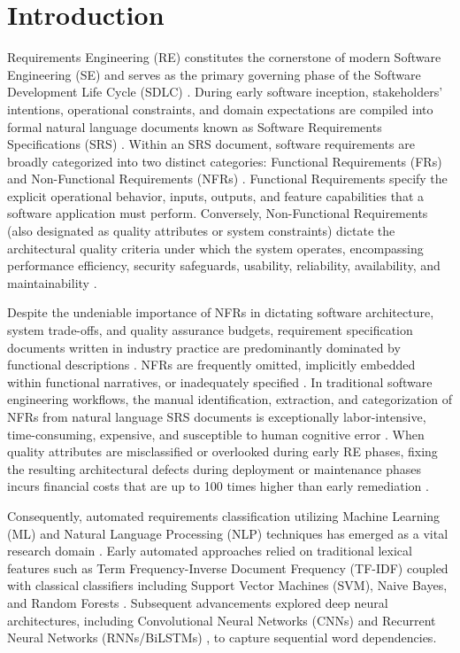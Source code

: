 \documentclass[11pt,a4paper]{article}
\begin{document}
\newpage

\section{Introduction}\label{sec:intro}
Requirements Engineering (RE) constitutes the cornerstone of modern Software Engineering (SE) and serves as the primary governing phase of the Software Development Life Cycle (SDLC) \cite{berry2017importance, fernandez2015naming}. During early software inception, stakeholders' intentions, operational constraints, and domain expectations are compiled into formal natural language documents known as Software Requirements Specifications (SRS) \cite{glinz2007non}. Within an SRS document, software requirements are broadly categorized into two distinct categories: Functional Requirements (FRs) and Non-Functional Requirements (NFRs) \cite{kurtanovic2017automatically, slankas2013automated}. Functional Requirements specify the explicit operational behavior, inputs, outputs, and feature capabilities that a software application must perform. Conversely, Non-Functional Requirements (also designated as quality attributes or system constraints) dictate the architectural quality criteria under which the system operates, encompassing performance efficiency, security safeguards, usability, reliability, availability, and maintainability \cite{abad2016do, cleland2007automated}.

Despite the undeniable importance of NFRs in dictating software architecture, system trade-offs, and quality assurance budgets, requirement specification documents written in industry practice are predominantly dominated by functional descriptions \cite{dalpiaz2020agile}. NFRs are frequently omitted, implicitly embedded within functional narratives, or inadequately specified \cite{lu2017automatic}. In traditional software engineering workflows, the manual identification, extraction, and categorization of NFRs from natural language SRS documents is exceptionally labor-intensive, time-consuming, expensive, and susceptible to human cognitive error \cite{sharma2020machine}. When quality attributes are misclassified or overlooked during early RE phases, fixing the resulting architectural defects during deployment or maintenance phases incurs financial costs that are up to 100 times higher than early remediation \cite{fernandez2015naming}.

Consequently, automated requirements classification utilizing Machine Learning (ML) and Natural Language Processing (NLP) techniques has emerged as a vital research domain \cite{kasper2022automated, winkler2018automatic}. Early automated approaches relied on traditional lexical features such as Term Frequency-Inverse Document Frequency (TF-IDF) coupled with classical classifiers including Support Vector Machines (SVM), Naive Bayes, and Random Forests \cite{kurtanovic2017automatically, slankas2013automated}. Subsequent advancements explored deep neural architectures, including Convolutional Neural Networks (CNNs) \cite{winkler2018automatic} and Recurrent Neural Networks (RNNs/BiLSTMs) \cite{jha2019using}, to capture sequential word dependencies. 
\end{document}
